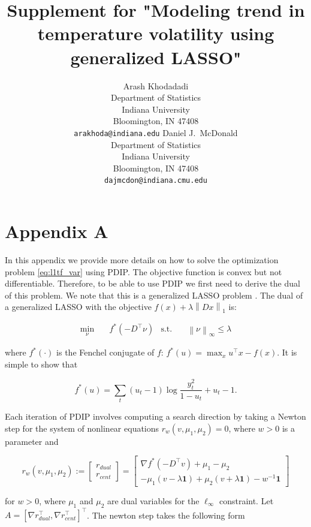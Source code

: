\documentclass{article}
\title{Supplement for "Modeling trend in temperature volatility using generalized LASSO"}
\author{Arash Khodadadi\\
 Department of Statistics\\
 Indiana University\\
 Bloomington, IN 47408 \\
 \texttt{arakhoda@indiana.edu}
\And
  Daniel J.\ McDonald \\
 Department of Statistics\\
 Indiana University\\
 Bloomington, IN 47408 \\
 \texttt{dajmcdon@indiana.cmu.edu}}
\newcommand{\one}{\mathbf{1}}
\newcommand{\norm}[1]{\left\lVert #1 \right\rVert}
\begin{document}
 


\maketitle

\section{Appendix A}
\label{sec:app_l1tf_var}

In this appendix we provide more details on how to solve the optimization problem \ref{eq:l1tf_var} using PDIP. The objective function is convex but not differentiable. Therefore, to be able to use PDIP we first need to derive the dual of this problem. We note that this is a generalized LASSO problem \citep{tibshirani_solution_2011}. The dual of a generalized LASSO with the objective $f(x)+\lambda \norm{ Dx }_1$ is:  

\begin{align}
\min_\nu&\quad f^*(-D^\top\nu) & \mbox{s.t.}&\quad \norm{ \nu }_\infty \le \lambda
\end{align}

where $f^*(\cdot)$ is the Fenchel conjugate of $f$: $f^*(u)=\max_x u^\top x-f(x)$. It is simple to show that 

\begin{equation}
f^*(u)=\sum_t (u_t-1)\log\frac{y_t^2}{1-u_t} + u_t-1.
\label{eq:conj}
\end{equation}

Each iteration of PDIP involves computing a search direction by taking a Newton step for the system of nonlinear equations $r_w(v,\mu_1,\mu_2)=0$, where $w>0$ is a parameter and

\begin{equation}
  r_w(v,\mu_1,\mu_2):=
	\begin{bmatrix}
	r_{dual}\\
	r_{cent}	
	\end{bmatrix}=
  \begin{bmatrix}
    \nabla f^*(-D^\top v) + \mu_1 - \mu_2\\
    -\mu_1(v-\lambda\one)+\mu_2(v + \lambda\one) -w^{-1}\one
  \end{bmatrix}
\label{eq:resid}
\end{equation}

for $w>0$, where $\mu_1$ and $\mu_2$ are dual variables for the $\ell_\infty$ constraint. Let $A=[\nabla r_{dual}^\top , \nabla r_{cent}^\top]^\top$. The newton step takes the following form
\end{document}

